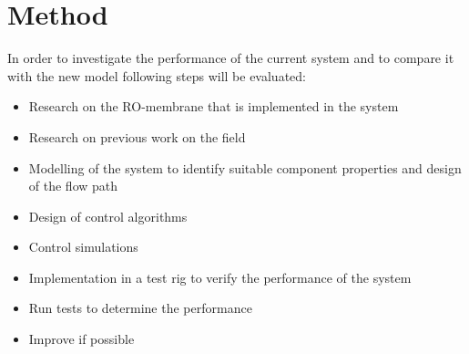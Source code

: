 \section{Method}

In order to investigate the performance of the current system and to compare it with the new model following steps will be evaluated:

\begin{itemize}
\renewcommand\labelitemi{-}
    \item Research on the RO-membrane that is implemented in the system  
    \item Research on previous work on the field
    \item Modelling of the system to identify suitable component properties and design of the flow path
    \item Design of control algorithms
    \item Control simulations
    \item Implementation in a test rig to verify the performance of the system
    \item Run tests to determine the performance
    \item Improve if possible
\end{itemize}




